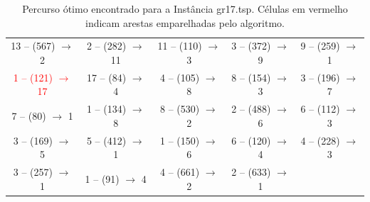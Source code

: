 \begin{table}[H]
\begin{tabular}{|c|c|c|c|c|}
    13 -- (567) $\rightarrow$ 2 & 2 -- (282) $\rightarrow$ 11 & 11 -- (110) $\rightarrow$ 3 & 3 -- (372) $\rightarrow$ 9 & 9 -- (259) $\rightarrow$ 1 \\
    \textcolor{red}{1 -- (121) $\rightarrow$ 17} & 17 -- (84) $\rightarrow$ 4 & 4 -- (105) $\rightarrow$ 8 & 8 -- (154) $\rightarrow$ 3 & 3 -- (196) $\rightarrow$ 7 \\
    7 -- (80) $\rightarrow$ 1 & 1 -- (134) $\rightarrow$ 8 & 8 -- (530) $\rightarrow$ 2 & 2 -- (488) $\rightarrow$ 6 & 6 -- (112) $\rightarrow$ 3 \\
    3 -- (169) $\rightarrow$ 5 & 5 -- (412) $\rightarrow$ 1 & 1 -- (150) $\rightarrow$ 6 & 6 -- (120) $\rightarrow$ 4 & 4 -- (228) $\rightarrow$ 3 \\
    3 -- (257) $\rightarrow$ 1 & 1 -- (91) $\rightarrow$ 4 & 4 -- (661) $\rightarrow$ 2 & 2 -- (633) $\rightarrow$ 1 &   \\
        \hline
    \end{tabular}
    \caption{Percurso ótimo encontrado para a Instância gr17.tsp. Células em vermelho indicam arestas emparelhadas pelo algoritmo.}
    \label{tab:percurso_gr17}
\end{table}
